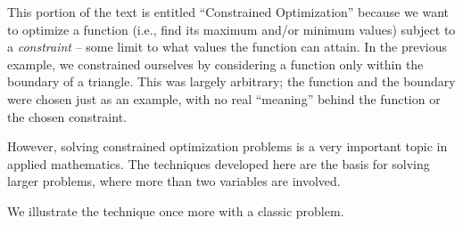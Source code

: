 This portion of the text is entitled ``Constrained Optimization'' because we want to optimize a function (i.e., find its maximum and/or minimum values) subject to a \textit{constraint} -- some limit to what values the function can attain. In the previous example, we constrained ourselves by considering a function only within the boundary of a triangle. This was largely arbitrary; the function and the boundary were chosen just as an example, with no real ``meaning'' behind the function or the chosen constraint.

However, solving constrained optimization problems is a very important topic in applied mathematics. The techniques developed here are the basis for solving larger problems, where more than two variables are involved.

We illustrate the technique once more with a classic problem.\\ 

